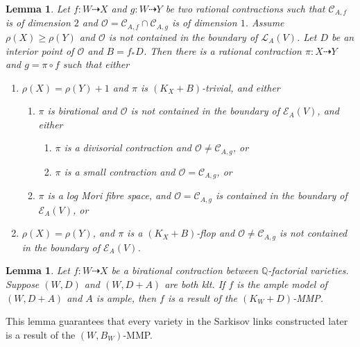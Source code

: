 \documentclass[11pt]{amsart}
\newtheorem{lem}[defn]{Lemma}
\begin{document}
\begin{lem}\label{mapbetweenAM2}
\cite[Lemma 3.5]{haconSarkisovProgram2012} Let $ f:W\dashrightarrow X $ and $ g:W\dashrightarrow  Y $ be two rational contractions such that $ \mathcal{C}_{A,f} $ is of dimension $ 2 $ and $ \mathcal{O}=\mathcal{C}_{A,f}\cap \mathcal{C}_{A,g} $ is of dimension $ 1 $. Assume $ \rho(X)\geqslant \rho(Y) $ and $ \mathcal{O} $ is not contained in the boundary of $ \mathcal{L}_{A}(V) $. Let $ D $ be an interior point of $ \mathcal{O} $ and $ B=f_*D $. Then there is a rational contraction $ \pi:X\dashrightarrow Y $ and $ g=\pi\circ f $ such that either
\begin{enumerate}
  \item $ \rho(X)=\rho(Y)+1 $ and $ \pi  $ is $ (K_X+B) $-trivial, and either
  \begin{enumerate}
    \item $ \pi $ is birational and $ \mathcal{O} $ is not contained in the boundary of $ \mathcal{E}_A(V) $, and either
    \begin{enumerate}
      \item $ \pi $ is a divisorial contraction and $ \mathcal{O}\neq \mathcal{C}_{A,g} $, or
      \item $ \pi $ is a small contraction and $ \mathcal{O}= \mathcal{C}_{A,g} $, or
    \end{enumerate}
    \item $ \pi $ is a log Mori fibre space, and $ \mathcal{O}=\mathcal{C}_{A,g} $ is contained in the boundary of $ \mathcal{E}_{A}(V) $, or
  \end{enumerate}
  \item $ \rho(X)=\rho(Y) $, and $ \pi $ is  a $ (K_X+B) $-flop and $ \mathcal{O}\neq\mathcal{C}_{A,g} $ is not contained in the boundary of $ \mathcal{E}_A(V) $.
  \end{enumerate}
\end{lem}

\begin{lem}
  \cite[Lemma 3.6]{haconSarkisovProgram2012} Let $f:W\dashrightarrow X $ be a birational contraction between $\mathbb{Q}$-factorial varieties. Suppose $(W,D)$ and $(W,D+A)$ are both klt. If $f$ is the ample model of $(W,D+A)$ and $A$ is ample, then $f$ is a result of the  $(K_{W}+D)$-MMP.
\end{lem}

This lemma guarantees that every variety in the Sarkisov links constructed later is a result of the $(W,B_{W})$-MMP.
\end{document}
